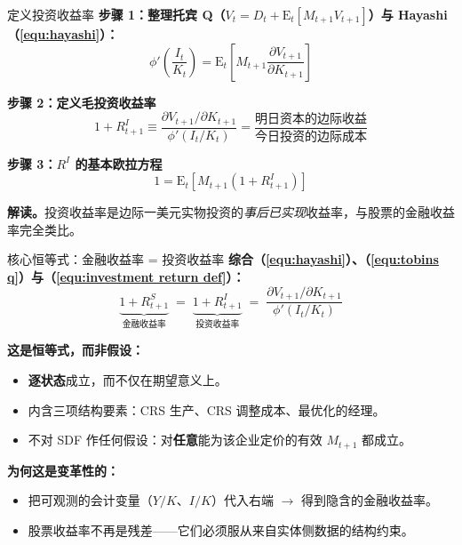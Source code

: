 \documentclass{beamer}
\begin{document}
\begin{frame}{定义投资收益率}
    \textbf{步骤 1：整理托宾 Q（$V_t = D_t + \mathrm{E}_t[M_{t+1}V_{t+1}]$）与 Hayashi（\ref{equ:hayashi}）：}
    \begin{equation*}
        \phi'\left(\frac{I_t}{K_t}\right) = \mathrm{E}_t\left[M_{t+1} \frac{\partial V_{t+1}}{\partial K_{t+1}}\right]
    \end{equation*}

    \textbf{步骤 2：定义毛投资收益率}
    \begin{equation}\label{equ:investment return def}
        \boxed{
        1 + R^I_{t+1} \equiv \frac{\partial V_{t+1}/\partial K_{t+1}}{\phi'(I_t/K_t)} = \frac{\text{明日资本的边际收益}}{\text{今日投资的边际成本}}
        }
    \end{equation}

    \textbf{步骤 3：$R^I$ 的基本欧拉方程}
    \begin{equation}\label{equ:investment euler}
        1 = \mathrm{E}_t\left[M_{t+1} (1 + R^I_{t+1})\right]
    \end{equation}

    \vspace{0.1cm}
    \textbf{解读。}投资收益率是边际一美元实物投资的\textit{事后已实现}收益率，与股票的金融收益率完全类比。
\end{frame}

\begin{frame}{核心恒等式：金融收益率 = 投资收益率}
    \textbf{综合（\ref{equ:hayashi}）、（\ref{equ:tobins q}）与（\ref{equ:investment return def}）：}
    \begin{equation}\label{equ:central identity}
        \boxed{
        \underbrace{1 + R^S_{t+1}}_{\text{金融收益率}} \;=\; \underbrace{1 + R^I_{t+1}}_{\text{投资收益率}}
        \;=\; \frac{\partial V_{t+1}/\partial K_{t+1}}{\phi'(I_t/K_t)}
        }
    \end{equation}

    \textbf{这是恒等式，而非假设：}
    \begin{itemize}
        \item \textbf{逐状态}成立，而不仅在期望意义上。
        \item 内含三项结构要素：CRS 生产、CRS 调整成本、最优化的经理。
        \item 不对 SDF 作任何假设：对\textbf{任意}能为该企业定价的有效 $M_{t+1}$ 都成立。
    \end{itemize}

    \vspace{0.1cm}
    \textbf{为何这是变革性的：}
    \begin{itemize}
        \item 把可观测的会计变量（$Y/K$、$I/K$）代入右端 $\rightarrow$ 得到隐含的金融收益率。
        \item 股票收益率不再是残差——它们必须服从来自实体侧数据的结构约束。
    \end{itemize}
\end{frame}
\end{document}
